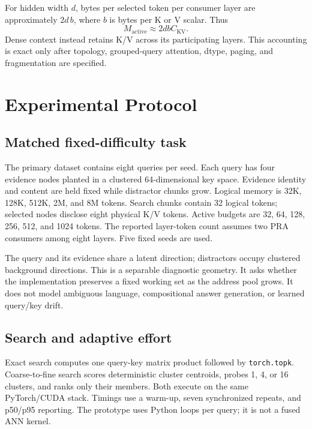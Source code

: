 \documentclass[10pt]{article}
\begin{document}
For hidden width $d$, bytes per selected token per consumer layer are
approximately $2d\,b$, where $b$ is bytes per K or V scalar. Thus
\begin{equation}
  M_{\mathrm{active}} \approx 2d b C_{\mathrm{KV}}.
\end{equation}
Dense context instead retains K/V across its participating layers. This accounting
is exact only after topology, grouped-query attention, dtype, paging, and
fragmentation are specified.

\section{Experimental Protocol}

\subsection{Matched fixed-difficulty task}

The primary dataset contains eight queries per seed. Each query has four evidence
nodes planted in a clustered 64-dimensional key space. Evidence identity and
content are held fixed while distractor chunks grow. Logical memory is
32K, 128K, 512K, 2M, and 8M tokens. Search chunks contain 32 logical tokens;
selected nodes disclose eight physical K/V tokens. Active budgets are 32, 64,
128, 256, 512, and 1024 tokens. The reported layer-token count assumes two PRA
consumers among eight layers. Five fixed seeds are used.

The query and its evidence share a latent direction; distractors occupy clustered
background directions. This is a separable diagnostic geometry. It asks whether
the implementation preserves a fixed working set as the address pool grows. It
does not model ambiguous language, compositional answer generation, or learned
query/key drift.

\subsection{Search and adaptive effort}

Exact search computes one query-key matrix product followed by
\texttt{torch.topk}. Coarse-to-fine search scores deterministic cluster centroids,
probes 1, 4, or 16 clusters, and ranks only their members. Both execute on the
same PyTorch/CUDA stack. Timings use a warm-up, seven synchronized repeats, and
p50/p95 reporting. The prototype uses Python loops per query; it is not a fused
ANN kernel.
\end{document}
